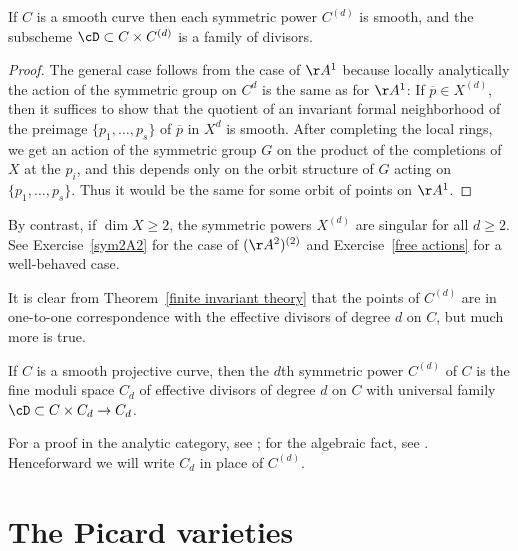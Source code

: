 \begin{proposition}
If $C$ is a smooth curve then each symmetric power $C^{(d)}$ is smooth, and the subscheme
$\cD \subset C\times C^{(d)}$ is a family of divisors.
\end{proposition}

\begin{proof}
 The general case follows from the case of $\AA^{1}$ because locally analytically the action of the symmetric group on $C^d$ is the same as for $\AA^1$: If  $\overline p \in X^{(d)}$, then it suffices to
 show that the quotient of an invariant formal neighborhood of the preimage $\{p_1,\dots, p_s\}$ of
 $\overline p$ in $X^d$  is smooth. After completing the local rings, we get an action of the symmetric group
 $G$ on the product of the completions of $X$ at the $p_i$, and this depends only on the orbit
 structure of $G$ acting on $\{p_1,\dots, p_s\}$. Thus it would be the same for some orbit of
 points on $\AA^1$.
 \end{proof}

By contrast, if $\dim X \geq 2$, the symmetric powers $X^{(d)}$ are singular for all $d \geq 2$.
See Exercise~\ref{sym2A2} for the case of $(\AA^2)^{(2)}$ and Exercise~\ref{free actions} for a well-behaved case.

It is clear from Theorem~\ref{finite invariant theory} that the points of $C^{(d)}$ are in one-to-one correspondence with the effective divisors of
degree $d$ on $C$, but much more is true. 

\begin{theorem}
If $C$ is a smooth projective curve, then the $d$th symmetric power $C^{(d)}$ of $C$ is the fine moduli space $C_d$ of effective divisors of degree $d$ on $C$ with universal family $\cD\subset C\times C_d \to C_d$.
\end{theorem}

For a proof in the analytic category, see \cite[]{ACGH}; for the algebraic fact, see \cite[Remark 9.3.9]{Kleiman-PicardScheme}.
Henceforward we will write $C_d$ in place of $C^{(d)}$.



\section{The Picard varieties}\label{Picard section}

